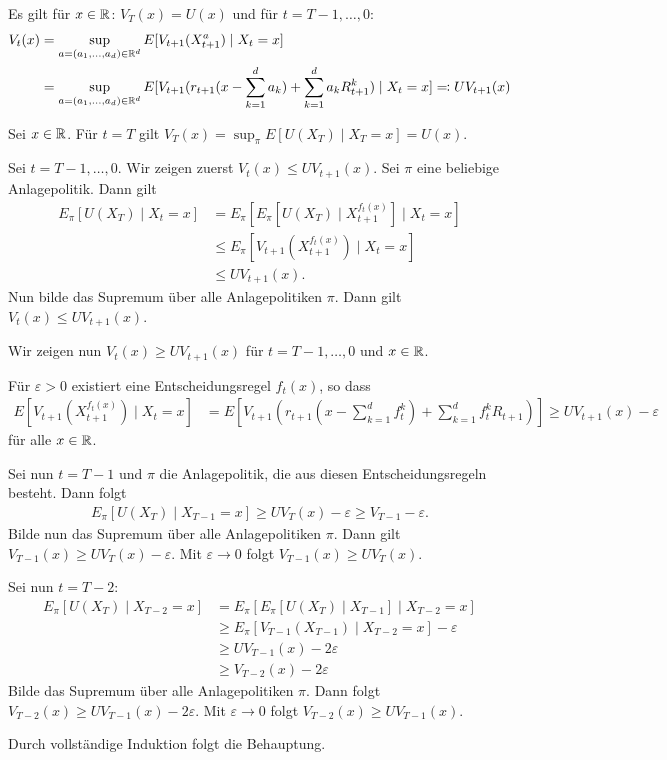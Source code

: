 \documentclass[a4paper,twoside,DIV15,BCOR12mm]{scrbook}
\begin{document}
\begin{satz}
Es gilt für $x\in\mathbb{R}$: $V_T(x) = U(x)$ und für $t=T-1,\ldots, 0$:
\begin{align*}
V_t(x) &= \sup_{a=(a_1,\ldots,a_d)\in\MdR^d} E[V_{t+1}(X_{t+1}^a) \mid X_t =x] \\
      &= \sup_{a=(a_1,\ldots,a_d)\in\MdR^d} E[V_{t+1}(r_{t+1}(x-\sum_{k=1}^d a_k) + \sum_{k=1}^d a_kR_{t+1}^k) \mid X_t =x] \ad UV_{t+1}(x)
\end{align*}
\end{satz}

\begin{beweis}
Sei $x\in\mathbb{R}$. Für $t=T$ gilt $V_T(x)=\sup_{\pi} E[U(X_T)\mid X_T=x] = U(x)$.

Sei $t=T-1,\ldots, 0$. Wir zeigen zuerst $V_t(x) \le UV_{t+1}(x)$. Sei $\pi$ eine beliebige Anlagepolitik. Dann gilt
\begin{align*}
E_\pi[U(X_T) \mid X_t=x] &= E_\pi[ E_\pi[U(X_T)\mid X_{t+1}^{f_t(x)}] \mid X_t=x] \\
&\le E_\pi[ V_{t+1}(X_{t+1}^{f_t(x)}) \mid X_t = x] \\
&\le UV_{t+1}(x).
\end{align*}
Nun bilde das Supremum über alle Anlagepolitiken $\pi$. Dann gilt $V_t(x) \le UV_{t+1}(x)$. 

Wir zeigen nun $V_t(x) \ge UV_{t+1}(x)$ für $t=T-1,\ldots,0$ und $x\in\mathbb{R}$.

Für $\varepsilon>0$ existiert eine Entscheidungsregel $f_t(x)$, so dass 
\begin{align*}
E[V_{t+1}(X_{t+1}^{f_t(x)}) \mid X_t = x] &= E[V_{t+1}(r_{t+1}(x-\sum_{k=1}^d f_t^k) + \sum_{k=1}^d f_t^k R_{t+1})] 
\ge UV_{t+1}(x) - \varepsilon
\end{align*}
für alle $x\in\mathbb{R}$.

Sei nun $t=T-1$ und $\pi$ die Anlagepolitik, die aus diesen Entscheidungsregeln besteht. Dann folgt
\begin{align*}
E_\pi[U(X_T) \mid X_{T-1} = x] \ge UV_T(x) - \varepsilon \ge V_{T-1} - \varepsilon.
\end{align*}
Bilde nun das Supremum über alle Anlagepolitiken $\pi$. Dann gilt $V_{T-1}(x) \ge UV_T(x) - \varepsilon$. Mit $\varepsilon \to 0$ folgt $V_{T-1}(x) \ge UV_T(x)$.

Sei nun $t=T-2$:
\begin{align*}
E_\pi[U(X_T) \mid X_{T-2}=x] &= E_\pi[ E_\pi[ U(X_T) \mid X_{T-1}] \mid X_{T-2} = x] \\
&\ge E_\pi[ V_{T-1}(X_{T-1}) \mid X_{T-2} = x] - \varepsilon \\
&\ge UV_{T-1}(x) - 2\varepsilon  \\
&\ge V_{T-2}(x) - 2\varepsilon
\end{align*}
Bilde das Supremum über alle Anlagepolitiken $\pi$. Dann folgt $V_{T-2}(x) \ge UV_{T-1}(x) - 2\varepsilon$.  Mit $\varepsilon \to 0$ folgt $V_{T-2}(x) \ge UV_{T-1}(x)$.

Durch vollständige Induktion folgt die Behauptung.
\end{beweis}
\end{document}
